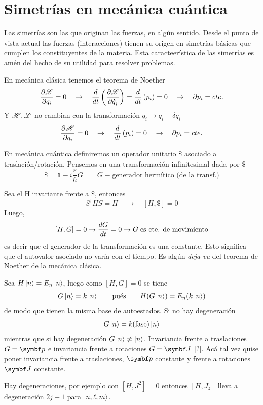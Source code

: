 \documentclass[10pt,oneside]{CBFT_book}
\begin{document}
\chapter{Simetrías en mecánica cuántica}

Las simetrías son las que originan las fuerzas, en algún sentido. Desde el punto de vista actual las
fuerzas (interacciones) tienen su origen en simetrías básicas que cumplen los constituyentes de la
materia.
Esta caracteerística de las simetrías es amén del hecho de su utilidad para resolver problemas.

En mecánica clásica tenemos el teorema de Noether 
\[
	\frac{\partial^{\hspace{-0.05em}} {\mathscr{L}}}{\partial {q_i}^{\hspace{-0.05em}}} = 0 \quad \to \quad \frac{d^{\hspace{-0.05em}} {}}{d {t}^{\hspace{-0.05em}}}\left( \frac{\partial^{\hspace{-0.05em}} {\mathscr{L}}}{\partial {\dot{q}_i}^{\hspace{-0.05em}}} \right) = 
	\frac{d^{\hspace{-0.05em}} {}}{d {t}^{\hspace{-0.05em}}}\left( p_i \right) = 0 \quad \rightarrow \quad \partial p_i = cte.
\]
Y $\mathscr{H}, \mathscr{L}$ no cambian con la transformación $q_i \longrightarrow q_i + \delta q_i$
\[
	\frac{\partial^{\hspace{-0.05em}} {\mathscr{H}}}{\partial {q_i}^{\hspace{-0.05em}}} = 0 \quad \to \quad  
	\frac{d^{\hspace{-0.05em}} {}}{d {t}^{\hspace{-0.05em}}}\left( p_i \right) = 0 \quad \rightarrow \quad \partial p_i = cte. 
\]

En mecánica cuántica definiremos un operador unitario $\$$ asociado a traslación/rotación. 
Pensemos en una transformación infinitesimal dada por $\$$
\[
	\mathbb{\$} = \mathbb{1} - i\frac{\varepsilon}{\hbar}G \qquad G \equiv \text{generador hermítico (de 
la transf.)}
\]

Sea el H invariante frente a $\$$, entonces 
\[
	S^\dagger HS = H \quad  \rightarrow \quad [H,\$] = 0 
\]
Luego,
\[	
	[H,G]=0 \rightarrow \frac{d^{\hspace{-0.05em}} {G}}{d {t}^{\hspace{-0.05em}}} = 0 \rightarrow G \;\text{es cte. de movimiento}
\]
es decir que el generador de la transformación es una constante.
Esto significa que el autovalor asociado no varía con el tiempo. Es algún {\it deja vu} del teorema
de Noether de la mecánica clásica.

Sea $H\Ket{n} = E_n \Ket{n}$, luego como $[H,G]=0$ se tiene 
\[
	G\Ket{n} = k\Ket{n} \qquad \text{pués} \qquad H(G\Ket{n}) = E_n(k\Ket{n})
\]
de modo que tienen la misma base de autoestados. Si no hay degeneración
\[
	G\ket{n} = k(\text{fase}) \Ket{n}
\]
mientras que si hay degeneración $G\Ket{n}\neq \Ket{n}$.
Invariancia frente a traslaciones $G=\vb{p}$ e invariancia frente a rotaciones $G=\vb{J}$ [?].
Acá tal vez quise poner invariancia frente a traslaciones, $\vb p$ constante y frente a rotaciones
$\vb J$ constante.

Hay degeneraciones, por ejemplo con $[H,J^2]=0$ entonces $[H,J_z]$ lleva a degeneración $2j+1$
para $\Ket{n,\ell,m}$.
\end{document}
